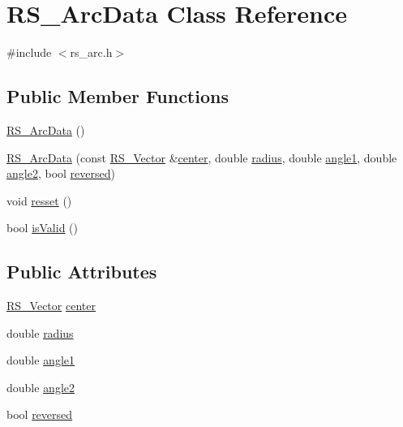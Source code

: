 \hypertarget{class_r_s___arc_data}{\section{R\-S\-\_\-\-Arc\-Data Class Reference}
\label{class_r_s___arc_data}
}


{\ttfamily \#include $<$rs\-\_\-arc.\-h$>$}

\subsection*{Public Member Functions}
\begin{DoxyCompactItemize}
\item 
\hyperlink{class_r_s___arc_data_a3fb5ef263c9005eb4f4c6f59590f9a24}{R\-S\-\_\-\-Arc\-Data} ()
\item 
\hyperlink{class_r_s___arc_data_a150343624b82ae52870b360aab97b5c6}{R\-S\-\_\-\-Arc\-Data} (const \hyperlink{class_r_s___vector}{R\-S\-\_\-\-Vector} \&\hyperlink{class_r_s___arc_data_a9e8f7a77a60b662b84fcb3cff5af3634}{center}, double \hyperlink{class_r_s___arc_data_a71a5a262e6d9f59d89a16f97a39ba562}{radius}, double \hyperlink{class_r_s___arc_data_a4d8201f6ecb109a2fccf1185df3689aa}{angle1}, double \hyperlink{class_r_s___arc_data_a87b35df714454db8549bc8e5190f1e91}{angle2}, bool \hyperlink{class_r_s___arc_data_a6f4ae85fb64896b834fcea80e50ab9ad}{reversed})
\item 
void \hyperlink{class_r_s___arc_data_a3d774e1767de3581a028cb859405469c}{resset} ()
\item 
bool \hyperlink{class_r_s___arc_data_acf0108393d2871469c8e143b45bde88c}{is\-Valid} ()
\end{DoxyCompactItemize}
\subsection*{Public Attributes}
\begin{DoxyCompactItemize}
\item 
\hyperlink{class_r_s___vector}{R\-S\-\_\-\-Vector} \hyperlink{class_r_s___arc_data_a9e8f7a77a60b662b84fcb3cff5af3634}{center}
\item 
double \hyperlink{class_r_s___arc_data_a71a5a262e6d9f59d89a16f97a39ba562}{radius}
\item 
double \hyperlink{class_r_s___arc_data_a4d8201f6ecb109a2fccf1185df3689aa}{angle1}
\item 
double \hyperlink{class_r_s___arc_data_a87b35df714454db8549bc8e5190f1e91}{angle2}
\item 
bool \hyperlink{class_r_s___arc_data_a6f4ae85fb64896b834fcea80e50ab9ad}{reversed}
\end{DoxyCompactItemize}
